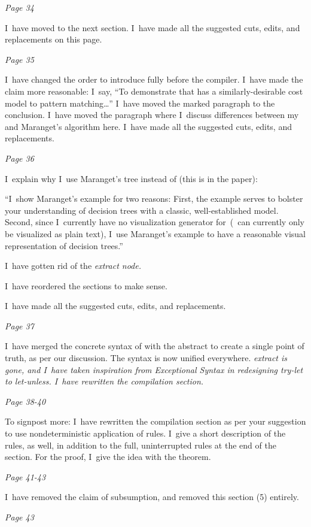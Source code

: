 \documentclass[manuscript,screen, 12pt, nonacm]{acmart}
\begin{document}
\it{Page 34}

I~have moved \D to the next section. I~have made all the suggested cuts, edits,
and replacements on this page. 

\it{Page 35}

I~have changed the order to introduce \D fully before the compiler. I~have made
the claim more reasonable: I~say, “To demonstrate that \VMinus has a
similarly-desirable cost model to pattern matching\dots” I~have moved the marked
paragraph to the conclusion. I~have moved the paragraph where I~discuss
differences between my and Maranget's algorithm here. I~have made all the
suggested cuts, edits, and replacements. 

\it{Page 36}

I~explain why I~use Maranget's tree instead of \D (this is in the paper): 

“I~show Maranget's example for two reasons: First, the example serves to bolster
your understanding of decision trees with a classic, well-established model.
Second, since I~currently have no visualization generator for~\D (\D~can
currently only be visualized as plain text), I~use Maranget's example to have a
reasonable visual representation of decision trees.”

I~have gotten rid of the \it{extract} node. 

I~have reordered the sections to make sense. 

I~have made all the suggested cuts, edits, and replacements. 

\it{Page 37}

I~have merged the concrete syntax of \D with the abstract to create a single
point of truth, as per our discussion.  The syntax is now unified everywhere.
\it{extract} is gone, and I~have taken inspiration from \it{Exceptional Syntax}
in redesigning \it{try-let} to \it{let-unless}. I~have rewritten the compilation
section. 

\it{Page 38-40}

To signpost more: I~have rewritten the compilation section as per your
suggestion to use nondeterministic application of rules. I~give a short
description of the rules, as well, in addition to the full, uninterrupted rules
at the end of the section. For the proof, I~give the idea with the theorem. 

\it{Page 41-43}

I~have removed the claim of subsumption, and removed this section (5) entirely. 

\it{Page 43}
\end{document}
